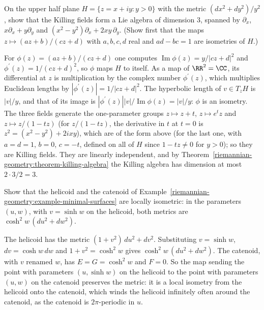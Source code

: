 \begin{exercise}\label{riemannian-geometry:exercise-killing-hyperbolic}
On the upper half plane $H = \{z = x + iy : y > 0\}$ with the metric $(dx^2 + dy^2)/y^2$, show that the Killing fields form a Lie algebra of dimension $3$, spanned by
$\partial_x$, $x\partial_x + y\partial_y$ and $(x^2 - y^2)\partial_x + 2xy\,\partial_y$. (Show first that the maps $z \mapsto (az + b)/(cz + d)$ with $a, b, c, d$ real and
$ad - bc = 1$ are isometries of $H$.)
\end{exercise}

\begin{solution}
For $\phi(z) = (az + b)/(cz + d)$ one computes $\operatorname{Im}\phi(z) = y/|cz + d|^2$ and $\phi^{\prime}(z) = 1/(cz + d)^2$, so $\phi$ maps $H$ to itself. As a map of
$\RR^2 = \CC$, its differential at $z$ is multiplication by the complex number $\phi^{\prime}(z)$, which multiplies Euclidean lengths by $|\phi^{\prime}(z)| = 1/|cz + d|^2$.
The hyperbolic length of $v \in T_zH$ is $|v|/y$, and that of its image is $|\phi^{\prime}(z)||v|/\operatorname{Im}\phi(z) = |v|/y$: $\phi$ is an isometry. The three fields generate the one-parameter groups
$z \mapsto z + t$, $z \mapsto e^tz$ and $z \mapsto z/(1 - tz)$ (for $z/(1 - tz)$, the derivative in $t$ at $t = 0$ is $z^2 = (x^2 - y^2) + 2ixy$), which are of the form above
(for the last one, with $a = d = 1$, $b = 0$, $c = -t$, defined on all of $H$ since $1 - tz \neq 0$ for $y > 0$); so they are Killing fields. They are linearly independent,
and by Theorem~\ref{riemannian-geometry:theorem-killing-algebra} the Killing algebra has dimension at most $2 \cdot 3/2 = 3$.
\end{solution}

\begin{exercise}\label{riemannian-geometry:exercise-catenoid-helicoid}
Show that the helicoid and the catenoid of Example~\ref{riemannian-geometry:example-minimal-surfaces} are locally isometric: in the parameters $(u, w)$, with $v = \sinh w$ on the
helicoid, both metrics are $\cosh^2w\,(du^2 + dw^2)$.
\end{exercise}

\begin{solution}
The helicoid has the metric $(1 + v^2)\,du^2 + dv^2$. Substituting $v = \sinh w$, $dv = \cosh w\,dw$ and $1 + v^2 = \cosh^2w$ gives $\cosh^2w\,(du^2 + dw^2)$. The catenoid,
with $v$ renamed $w$, has $E = G = \cosh^2w$ and $F = 0$. So the map sending the point with parameters $(u, \sinh w)$ on the helicoid to the point with parameters $(u, w)$ on
the catenoid preserves the metric: it is a local isometry from the helicoid onto the catenoid, which winds the helicoid infinitely often around the catenoid, as the catenoid is
$2\pi$-periodic in $u$.
\end{solution}

